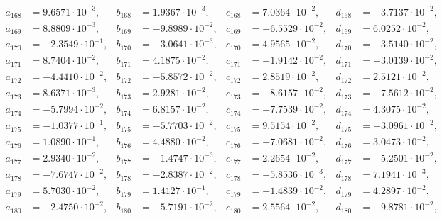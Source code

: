 \begin{align*}
  a_{ 168 } &= 9.6571 \cdot 10^{ -3 }, & b_{ 168 } &= 1.9367 \cdot 10^{ -3 }, & c_{ 168 } &= 7.0364 \cdot 10^{ -2 }, & d_{ 168 } &= -3.7137 \cdot 10^{ -2 }, \\ 
  a_{ 169 } &= 8.8809 \cdot 10^{ -3 }, & b_{ 169 } &= -9.8989 \cdot 10^{ -2 }, & c_{ 169 } &= -6.5529 \cdot 10^{ -2 }, & d_{ 169 } &= 6.0252 \cdot 10^{ -2 }, \\ 
  a_{ 170 } &= -2.3549 \cdot 10^{ -1 }, & b_{ 170 } &= -3.0641 \cdot 10^{ -3 }, & c_{ 170 } &= 4.9565 \cdot 10^{ -2 }, & d_{ 170 } &= -3.5140 \cdot 10^{ -2 }, \\ 
  a_{ 171 } &= 8.7404 \cdot 10^{ -2 }, & b_{ 171 } &= 4.1875 \cdot 10^{ -2 }, & c_{ 171 } &= -1.9142 \cdot 10^{ -2 }, & d_{ 171 } &= -3.0139 \cdot 10^{ -2 }, \\ 
  a_{ 172 } &= -4.4410 \cdot 10^{ -2 }, & b_{ 172 } &= -5.8572 \cdot 10^{ -2 }, & c_{ 172 } &= 2.8519 \cdot 10^{ -2 }, & d_{ 172 } &= 2.5121 \cdot 10^{ -2 }, \\ 
  a_{ 173 } &= 8.6371 \cdot 10^{ -3 }, & b_{ 173 } &= 2.9281 \cdot 10^{ -2 }, & c_{ 173 } &= -8.6157 \cdot 10^{ -2 }, & d_{ 173 } &= -7.5612 \cdot 10^{ -2 }, \\ 
  a_{ 174 } &= -5.7994 \cdot 10^{ -2 }, & b_{ 174 } &= 6.8157 \cdot 10^{ -2 }, & c_{ 174 } &= -7.7539 \cdot 10^{ -2 }, & d_{ 174 } &= 4.3075 \cdot 10^{ -2 }, \\ 
  a_{ 175 } &= -1.0377 \cdot 10^{ -1 }, & b_{ 175 } &= -5.7703 \cdot 10^{ -2 }, & c_{ 175 } &= 9.5154 \cdot 10^{ -2 }, & d_{ 175 } &= -3.0961 \cdot 10^{ -2 }, \\ 
  a_{ 176 } &= 1.0890 \cdot 10^{ -1 }, & b_{ 176 } &= 4.4880 \cdot 10^{ -2 }, & c_{ 176 } &= -7.0681 \cdot 10^{ -2 }, & d_{ 176 } &= 3.0473 \cdot 10^{ -2 }, \\ 
  a_{ 177 } &= 2.9340 \cdot 10^{ -2 }, & b_{ 177 } &= -1.4747 \cdot 10^{ -3 }, & c_{ 177 } &= 2.2654 \cdot 10^{ -2 }, & d_{ 177 } &= -5.2501 \cdot 10^{ -2 }, \\ 
  a_{ 178 } &= -7.6747 \cdot 10^{ -2 }, & b_{ 178 } &= -2.8387 \cdot 10^{ -2 }, & c_{ 178 } &= -5.8536 \cdot 10^{ -3 }, & d_{ 178 } &= 7.1941 \cdot 10^{ -3 }, \\ 
  a_{ 179 } &= 5.7030 \cdot 10^{ -2 }, & b_{ 179 } &= 1.4127 \cdot 10^{ -1 }, & c_{ 179 } &= -1.4839 \cdot 10^{ -2 }, & d_{ 179 } &= 4.2897 \cdot 10^{ -2 }, \\ 
  a_{ 180 } &= -2.4750 \cdot 10^{ -2 }, & b_{ 180 } &= -5.7191 \cdot 10^{ -2 }, & c_{ 180 } &= 2.5564 \cdot 10^{ -2 }, & d_{ 180 } &= -9.8781 \cdot 10^{ -2 }, \\ 

\end{align*}
